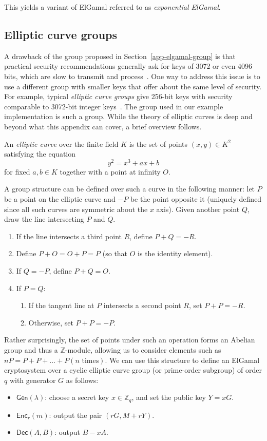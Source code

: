 \documentclass[12pt,a4paper]{article}
\theoremstyle{definition}
\begin{document}
This yields a variant of ElGamal referred to as \textit{exponential ElGamal}.

\subsection{Elliptic curve groups}
A drawback of the group proposed in Section~\ref{app-elgamal-group} is that practical security recommendations generally ask for keys of 3072 or even 4096 bits, which are slow to transmit and process~\cite{barker2018transitioning}. One way to address this issue is to use a different group with smaller keys that offer about the same level of security. For example, typical \textit{elliptic curve groups} give 256-bit keys with security comparable to 3072-bit integer keys~\cite{bafandehkar2013comparison}. The group used in our example implementation is such a group. While the theory of elliptic curves is deep and beyond what this appendix can cover, a brief overview follows.

\begin{definition}
    An \textit{elliptic curve} over the finite field $K$ is the set of points $(x, y)\in K^2$ satisfying the equation
    $$y^2 = x^3 + ax + b$$
    for fixed $a, b\in K$ together with a point at infinity $O$.
\end{definition}

A group structure can be defined over such a curve in the following manner: let $P$ be a point on the elliptic curve and $-P$ be the point opposite it (uniquely defined since all such curves are symmetric about the $x$ axis). Given another point $Q$, draw the line intersecting $P$ and $Q$.
\begin{enumerate}
    \item If the line intersects a third point $R$, define $P + Q = -R$.
    \item Define $P + O = O + P = P$ (so that $O$ is the identity element).
    \item If $Q = -P$, define $P + Q = O$.
    \item If $P = Q$:
    \begin{enumerate}
        \item If the tangent line at $P$ intersects a second point $R$, set $P + P = -R$.
        \item Otherwise, set $P + P = -P$.
    \end{enumerate}
\end{enumerate}
Rather surprisingly, the set of points under such an operation forms an Abelian group and thus a $\mathbb{Z}$-module, allowing us to consider elements such as $nP = P + P + \ldots + P (n \text{ times})$. We can use this structure to define an ElGamal cryptosystem over a cyclic elliptic curve group (or prime-order subgroup) of order $q$ with generator $G$ as follows:
\begin{itemize}
    \item $\mathsf{Gen}(\lambda)$: choose a secret key $x\in\mathbb{Z}_q$, and set the public key $Y = xG$.
    \item $\mathsf{Enc}_r(m)$: output the pair $(rG, M + rY)$.
    \item $\mathsf{Dec}(A, B)$: output $B - xA$.
\end{itemize}
\newpage
\end{document}

